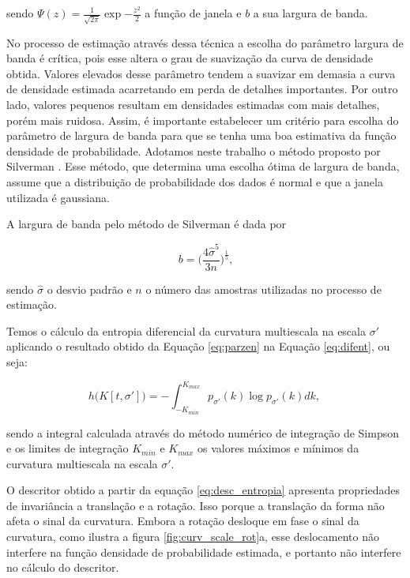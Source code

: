 sendo $\Psi(z) = \frac{1}{\sqrt{2\pi}}\exp{-\frac{z^2}{2}}$ a função de janela e $b$ a sua largura de banda.

No processo de estimação através dessa técnica a escolha do parâmetro largura de banda é crítica, pois esse altera o grau de suavização da curva de densidade obtida. Valores elevados desse parâmetro tendem a suavizar em demasia a curva de densidade estimada acarretando em perda de detalhes importantes. Por outro lado, valores pequenos resultam em densidades estimadas com mais detalhes, porém mais ruidosa. Assim, é importante estabelecer um critério para escolha do parâmetro de largura de banda para que se tenha uma boa estimativa da função densidade de probabilidade. Adotamos neste trabalho o método proposto por Silverman \cite{silverman:1986}. Esse método, que determina uma escolha ótima de largura de banda, assume que a distribuição de probabilidade dos dados é normal e que a janela utilizada é gaussiana.

A largura de banda pelo método de Silverman é dada por \cite{silverman:1986}

\begin{equation}
b = \big(\frac{4\hat{\sigma}^5}{3n}\big)^\frac{1}{5}\text{,}
\end{equation}

sendo $\hat{\sigma}$ o desvio padrão e $n$ o número das amostras utilizadas no processo de estimação. 

Temos o cálculo da entropia diferencial da curvatura multiescala na escala $\sigma'$ aplicando o resultado obtido da Equação \ref{eq:parzen} na Equação \ref{eq:difent}, ou seja:

\begin{equation}\label{eq:desc_entropia}
h\big(K[t,\sigma']\big) = -\int_{-K_{min}}^{K_{max}}p_{\sigma'}(k)\log{p_{\sigma'}(k)}dk\text{, }
\end{equation}

sendo a integral calculada através do método numérico de integração de Simpson e os limites de integração $K_{min}$ e $K_{max}$ os valores máximos e mínimos da curvatura multiescala na escala $\sigma'$.

O descritor obtido a partir da equação \ref{eq:desc_entropia} apresenta propriedades de invariância a translação e a rotação. Isso porque a translação da forma não afeta o sinal da curvatura. Embora a rotação desloque em fase o sinal da curvatura, como ilustra a figura \ref{fig:curv_scale_rot}a, esse deslocamento não interfere na função densidade de probabilidade estimada, e portanto não interfere no cálculo do descritor.

